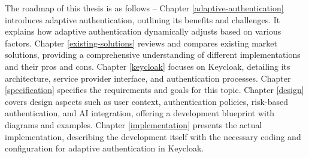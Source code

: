 The roadmap of this thesis is as follows -- Chapter \ref{adaptive-authentication} introduces adaptive authentication, outlining its benefits and challenges.
It explains how adaptive authentication dynamically adjusts based on various factors.
Chapter \ref{existing-solutions} reviews and compares existing market solutions, providing a comprehensive understanding of different implementations and their pros and cons.
Chapter \ref{keycloak} focuses on Keycloak, detailing its architecture, service provider interface, and authentication processes.
Chapter \ref{specification} specifies the requirements and goals for this topic.
Chapter \ref{design} covers design aspects such as user context, authentication policies, risk-based authentication, and AI integration, offering a development blueprint with diagrams and examples.
Chapter \ref{implementation} presents the actual implementation, describing the development itself with the necessary coding and configuration for adaptive authentication in Keycloak.